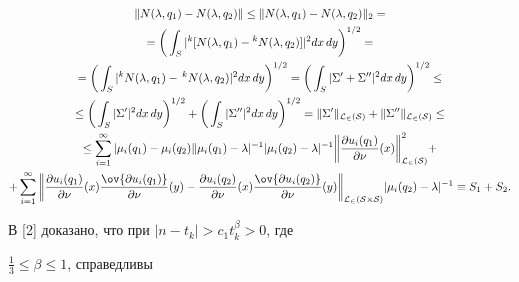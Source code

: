 \begin{gather*} 


\|N(\lambda,q_1)-N(\lambda,q_2)\|\le 


\|N(\lambda,q_1)-N(\lambda,q_2)\|_2=\\ 


% 


=\bigg(\int_S|^k[N(\lambda,q_1)-{}^k N(\lambda,q_2)]|^2 


dx\,dy\bigg)^{1/2}=\\ 


% 


=\bigg(\int_S|^k N(\lambda,q_1)-\,^k N(\lambda,q_2)|^2 


dx\,dy\bigg)^{1/2}= 


\bigg(\int_S|\Sigma'+\Sigma''|^2dx\,dy \bigg)^{1/2}\le \\ 


% 


\le\bigg(\int_S|\Sigma'|^2dx\,dy \bigg)^{1/2}+ 


\bigg(\int_S|\Sigma''|^2dx\,dy \bigg)^{1/2}= 


\|\Sigma'\|_{\cal L_2(S)}+\|\Sigma''\|_{\cal L_2(S)}\le \\ 


% 


\le\sum^\infty_{i=1}|\mu_i(q_1)-\mu_i(q_2) 


\|\mu_i(q_1)-\lambda|^{-1}|\mu_i(q_2)-\lambda|^{-1} 


\bigg\|\frac{\partial u_i(q_1)}{\partial\nu}(x) 


\bigg\|^2_{\cal L_2(S)}+\\ 


% 


+\sum^\infty_{i=1}\bigg\| 


\frac{\partial u_i(q_1)}{\partial\nu}(x) 


\frac{\ov{\partial u_i(q_1)}}{\partial\nu}(y)- 


\frac{\partial u_i(q_2)}{\partial\nu}(x) 


\frac{\ov{\partial u_i(q_2)}}{\partial\nu}(y) 


\bigg\|_{\cal L_2(S\times S)} 


|\mu_i(q_2)-\lambda|^{-1}\equiv S_1+S_2. 


\end{gather*} 


 


В [2] доказано, что при $|n-t_k|>c_1t^\beta_k>0$, где 


$\frac{1}{3}\le\beta\le1$, справедливы 


